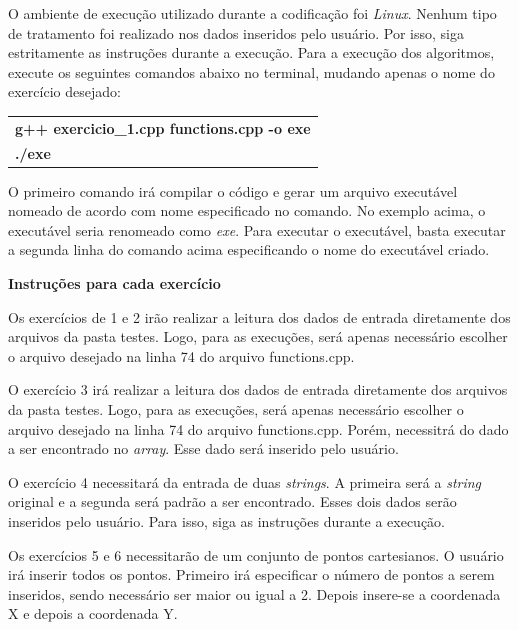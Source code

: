 \documentclass[12pt,a4paper]{article}
\begin{document}
O ambiente de execução utilizado durante a codificação foi \textit{Linux}. Nenhum tipo de tratamento foi realizado nos dados inseridos pelo usuário. Por isso, siga estritamente as instruções durante a execução. Para a execução dos algoritmos, execute os seguintes comandos abaixo no terminal, mudando apenas o nome do exercício desejado:

\begin{table}[H]
	\centering
	\begin{tabular}{|l|}
		\hline
		\textbf{g++ exercicio\_1.cpp functions.cpp -o exe}\\		
		\textbf{./exe}\\
		\hline
	\end{tabular}
\end{table}

O primeiro comando irá compilar o código e gerar um arquivo executável nomeado de acordo com nome especificado no comando. No exemplo acima, o executável seria renomeado como \textit{exe}. Para executar o executável, basta executar a segunda linha do comando acima especificando o nome do executável criado.

\newpage

{\Large \textbf{Instruções para cada exercício}}

\vspace{0.5cm}

Os exercícios de 1 e 2 irão realizar a leitura dos dados de entrada diretamente dos arquivos da pasta \textsf{testes}. Logo, para as execuções, será apenas necessário escolher o arquivo desejado na linha \textsf{74} do arquivo \textsf{functions.cpp}.

O exercício 3 irá realizar a leitura dos dados de entrada diretamente dos arquivos da pasta \textsf{testes}. Logo, para as execuções, será apenas necessário escolher o arquivo desejado na linha \textsf{74} do arquivo \textsf{functions.cpp}. Porém, necessitrá do dado a ser encontrado no \textit{array}. Esse dado será inserido pelo usuário.

O exercício 4 necessitará da entrada de duas \textit{strings}. A primeira será a \textit{string} original e a segunda será padrão a ser encontrado. Esses dois dados serão inseridos pelo usuário. Para isso, siga as instruções durante a execução.

Os exercícios 5 e 6 necessitarão de um conjunto de pontos cartesianos. O usuário irá inserir todos os pontos. Primeiro irá especificar o número de pontos a serem inseridos, sendo necessário ser maior ou igual a 2. Depois insere-se a coordenada X e depois a coordenada Y. 
\end{document}
